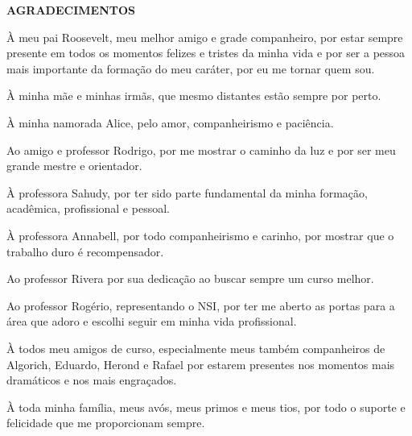 \begin{center}
\textbf{AGRADECIMENTOS} \\ [2.5cm]
\end{center}

À meu pai Roosevelt, meu melhor amigo e grade companheiro, por estar sempre presente em todos os momentos felizes e tristes da minha vida e por ser a pessoa mais importante da formação do meu caráter, por eu me tornar quem sou.

À minha mãe e minhas irmãs, que mesmo distantes estão sempre por perto.

À minha namorada Alice, pelo amor, companheirismo e paciência.

Ao amigo e professor Rodrigo, por me mostrar o caminho da luz e por ser meu grande mestre e orientador.

À professora Sahudy, por ter sido parte fundamental da minha formação, acadêmica, profissional e pessoal.

À professora Annabell, por todo companheirismo e carinho, por mostrar que o trabalho duro é recompensador.

Ao professor Rivera por sua dedicação ao buscar sempre um curso melhor.

Ao professor Rogério, representando o NSI, por ter me aberto as portas para a área que adoro e escolhi seguir em minha vida profissional.

À todos meu amigos de curso, especialmente meus também companheiros de Algorich, Eduardo, Herond e Rafael por estarem presentes nos momentos mais dramáticos e nos mais engraçados.

À toda minha família, meus avós, meus primos e meus tios, por todo o suporte e felicidade que me proporcionam sempre.